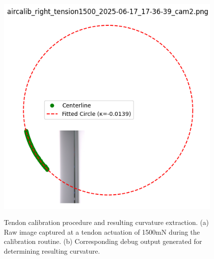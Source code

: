 \begin{figure}[H]
\begin{subcaptionbox}
        {\includegraphics[width=\linewidth]{images/ribbonadapter/aircalib_right_tension1500_2025-06-17_17-36-39_cam2_debug3.png}}
    \end{subcaptionbox}
    \caption{Tendon calibration procedure and resulting curvature extraction. (a) Raw image captured at a tendon actuation of 1500mN during the calibration routine. (b) Corresponding debug output generated for determining resulting curvature.}
    \label{fig:ribbonadaptation}
\end{figure}

